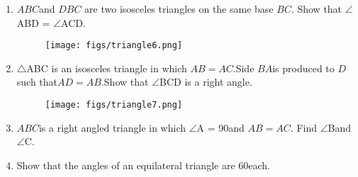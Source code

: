 \documentclass[12pt]{article}
\begin{document}
\begin{enumerate}
\item $ABC$and $DBC$ are two isosceles triangles on the same base $BC$. Show that
$\angle$ABD = $\angle$ACD.
\begin{figure}[!h]
\begin{center}
\texttt{[image: figs/triangle6.png]}
\end{center}                                      \caption{}                                        \label{fig:Fig1}                                  \end{figure}
\item$\triangle$ABC is an isosceles triangle in which $AB = AC$.Side $BA $is produced to $D$ such that$ AD = AB$.Show that $\angle$BCD is a right angle.
	\begin{figure}[!h]
\begin{center}
\texttt{[image: figs/triangle7.png]}
\end{center}                                      \caption{}                                        \label{fig:Fig1}                                  \end{figure}
\item $ABC$is a right angled triangle in which $\angle$A = 90\degree and $AB = AC$. Find $\angle$Band $\angle$C.
\item Show that the angles of an equilateral triangle are 60\degree each.
\end{enumerate}
\end{document}
